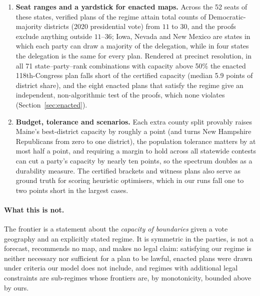 \begin{enumerate}[leftmargin=*]
\item \textbf{Seat ranges and a yardstick for enacted maps.} Across the 52 seats of these states, verified plans of the regime attain total counts of Democratic-majority districts (2020 presidential vote) from $11$ to $30$, and the proofs exclude anything outside $11$--$36$; Iowa, Nevada and New Mexico are states in which each party can draw a majority of the delegation, while in four states the delegation is the same for every plan. Rendered at precinct resolution, in all 71 state--party--rank combinations with capacity above 50\% the enacted 118th-Congress plan falls short of the certified capacity (median 5.9 points of district share), and the eight enacted plans that satisfy the regime give an independent, non-algorithmic test of the proofs, which none violates (Section~\ref{sec:enacted}).
\item \textbf{Budget, tolerance and scenarios.} Each extra county split provably raises Maine's best-district capacity by roughly a point (and turns New Hampshire Republicans from zero to one district), the population tolerance matters by at most half a point, and requiring a margin to hold across all statewide contests can cut a party's capacity by nearly ten points, so the spectrum doubles as a durability measure. The certified brackets and witness plans also serve as ground truth for scoring heuristic optimisers, which in our runs fall one to two points short in the largest cases.
\end{enumerate}

\paragraph{What this is not.} The frontier is a statement about the \emph{capacity of boundaries} given a vote geography and an explicitly stated regime. It is symmetric in the parties, is not a forecast, recommends no map, and makes no legal claim: satisfying our regime is neither necessary nor sufficient for a plan to be lawful, enacted plans were drawn under criteria our model does not include, and regimes with additional legal constraints are sub-regimes whose frontiers are, by monotonicity, bounded above by ours.
